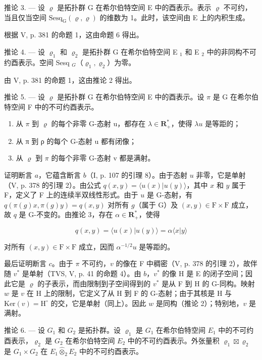 推论 3. --- 设 \(\varrho\) 是拓扑群 G 在希尔伯特空间 E 中的酉表示。表示 \(\varrho\) 不可约，当且仅当空间 \(\mathrm{Sesq}_{\mathrm{G}}(\varrho, \varrho)\) 的维数为 1。此时，该空间由 E 上的内积生成。

根据 V, p. 381 的命题 1，这由命题 6 得出。

推论 4. --- 设 \(\varrho_{1}\) 和 \(\varrho_{2}\) 是拓扑群 G 在希尔伯特空间 E \(_{1}\) 和 E \(_{2}\) 中的非同构不可约酉表示。空间 Sesq \(_{G}\)（\(\varrho_{1}, \varrho_{2}\)）为零。

由 V, p. 381 的命题 1，这由推论 2 得出。

推论 5. --- 设 \(\varrho\) 是拓扑群 G 在希尔伯特空间 E 中的酉表示。设 \(\pi\) 是 G 在希尔伯特空间 F 中的不可约酉表示。

\begin{enumerate}
\def\labelenumi{\alph{enumi})}
\item
  从 \(\pi\) 到 \(\varrho\) 的每个非零 G-态射 u，都存在 \(\lambda \in \mathbf{R}_{+}^{*}\)，使得 \(\lambda u\) 是等距的；
\item
  从 π 到 ρ 的每个 G-态射 u 都有闭像；
\item
  从 \(\varrho\) 到 \(\pi\) 的每个非零 G-态射 v 都是满射。
\end{enumerate}

证明断言 \(a\)，它蕴含断言 \(b\)（I, p. 107 的引理 8）。由于态射 \(u\) 非零，它是单射（V, p. 378 的引理 2）。由公式 \(q(x,y) = \langle u(x)|u(y)\rangle\)，其中 \(x\) 和 \(y\) 属于 F，定义了 F 上的连续半双线性形式。由于 \(u\) 是 G-态射，有 \(q(\pi(g)x,\pi(g)y) = q(x,y)\) 对所有 \(g\)（属于 G）及 \((x,y)\in\mathrm{F}\times\mathrm{F}\) 成立，故 \(q\) 是 G-不变的。由推论 3，存在 \(\alpha\in\mathbf{R}_{+}^{*}\)，使得

\[
q (x, y) = \langle u (x) | u (y) \rangle = \alpha \langle x | y \rangle
\]

对所有 \((x,y)\in\mathrm{F}\times\mathrm{F}\) 成立，因而 \(\alpha^{-1/2}u\) 是等距的。

最后证明断言 \(c\)。由于 \(\pi\) 不可约，\(v\) 的像在 F 中稠密（V, p. 378 的引理 2），故伴随 \(v^*\) 是单射（TVS, V, p. 41 的命题 4）。由 \(b\)，\(v^*\) 的像 H 是 E 的闭子空间；因此它是 \(\varrho\) 的子表示，而由限制到子空间得到的 \(v^*\) 是从 F 到 H 的 G-同构。映射 \(w\) 是 \(v\) 在 H 上的限制，它定义了从 H 到 F 的 G-态射；由于其核是 H 与 \(\text{Ker}(v) = \text{H}^\circ\) 的交，它是单射（同上）。因此 \(w\) 是同构（推论 2）；特别地，\(v\) 是满射。

推论 6. --- 设 \(G_{1}\) 和 \(G_{2}\) 是拓扑群。设 \(\varrho_{1}\) 是 \(G_{1}\) 在希尔伯特空间 \(E_{1}\) 中的不可约酉表示，\(\varrho_{2}\) 是 \(G_{2}\) 在希尔伯特空间 \(E_{2}\) 中的不可约酉表示。外张量积 \(\varrho_{1} \boxtimes \varrho_{2}\) 是 \(G_{1} \times G_{2}\) 在 \(E_{1} \widehat{\otimes}_{2} E_{2}\) 中的不可约酉表示。

